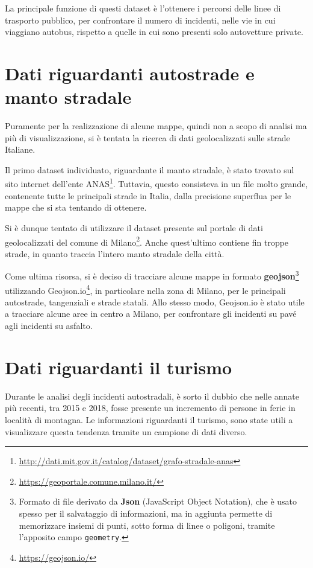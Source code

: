 \documentclass[a4paper,12pt]{report}
\newcommand{\columnstyle}[1]{\texttt{#1}}
\begin{document}
La principale funzione di questi dataset è l'ottenere i percorsi delle linee di trasporto pubblico, 
per confrontare il numero di incidenti, nelle vie in cui viaggiano autobus, rispetto a 
quelle in cui sono presenti solo autovetture private. 

\section{Dati riguardanti autostrade e manto stradale}

Puramente per la realizzazione di alcune mappe, quindi non a scopo di analisi 
ma più di visualizzazione, si è tentata la ricerca di dati geolocalizzati sulle 
strade Italiane. 

Il primo dataset individuato, riguardante il manto  stradale, è stato trovato sul sito 
internet dell'ente  
ANAS\footnote{\url{http://dati.mit.gov.it/catalog/dataset/grafo-stradale-anas}}. 
Tuttavia, questo consisteva in un file molto grande, contenente tutte le principali 
strade in Italia, dalla precisione superflua per le mappe che si sta tentando di ottenere. 

Si è dunque tentato di utilizzare il dataset presente sul portale di dati geolocalizzati 
del comune di Milano\footnote{\url{https://geoportale.comune.milano.it/}}. 
Anche quest'ultimo contiene fin troppe strade, in quanto traccia l'intero manto 
stradale della città. 

Come ultima risorsa, si è deciso di tracciare alcune mappe in formato 
\textbf{geojson}\footnote{Formato di file derivato da \textbf{Json} 
(JavaScript Object Notation), che è usato spesso per il salvataggio di informazioni, ma 
in aggiunta permette di memorizzare insiemi di punti, sotto forma di linee o poligoni, 
tramite l'apposito campo \columnstyle{geometry}.} utilizzando 
Geojson.io\footnote{\url{https://geojson.io/}}, in particolare nella zona di Milano, 
per le principali autostrade, tangenziali e strade statali. 
Allo stesso modo, Geojson.io è stato utile a tracciare alcune aree in centro a Milano, 
per confrontare gli incidenti su pavé agli incidenti su asfalto. 

\section{Dati riguardanti il turismo}

Durante le analisi degli incidenti autostradali, è sorto il dubbio che 
nelle annate più recenti, tra 2015 e 2018, 
fosse presente un incremento di persone in ferie in località di montagna. 
Le informazioni riguardanti il turismo, sono state utili a visualizzare questa tendenza 
tramite un campione di dati diverso. 
\end{document}
